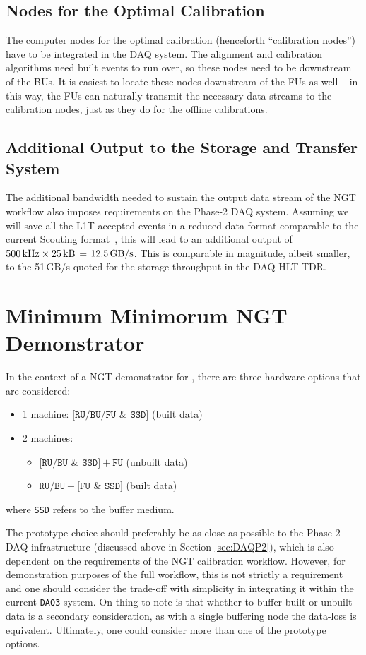 \subsection{Nodes for the Optimal Calibration}
The computer nodes for the optimal calibration (henceforth ``calibration nodes'') have to be integrated in the DAQ system.
The alignment and calibration algorithms need built events to run over, so these nodes need to be downstream of the BUs.
It is easiest to locate these nodes downstream of the FUs as well --
in this way, the FUs can naturally transmit the necessary data streams to the calibration nodes, 
just as they do for the offline calibrations.

\subsection{Additional Output to the Storage and Transfer System}
The additional bandwidth needed to sustain the output data stream of the NGT workflow also imposes requirements on the Phase-2 DAQ system.
Assuming we will save all the L1T-accepted events in a reduced data format comparable to the current Scouting format~\cite{CMS:2024zhe},
this will lead to an additional output of $500\,\text{kHz} 
\times 25\,\text{kB}$ = $12.5\,\text{GB/s}$.
This is comparable in magnitude, albeit smaller, to the 51\,GB/s quoted for the storage throughput in the DAQ-HLT TDR.

\section{Minimum Minimorum NGT Demonstrator}
In the context of a NGT demonstrator for \Runthree, there are three hardware options that are considered:
\begin{itemize}
    \item 1 machine: $[\texttt{RU/BU}/\texttt{FU}$ \& $\texttt{SSD}]$ (built data)
    \item 2 machines: 
    \begin{itemize}
        \item $[\texttt{RU/BU}$ \& $\texttt{SSD}] + \texttt{FU}$ (unbuilt data)
        \item $\texttt{RU/BU} + [\texttt{FU}$ \& $\texttt{SSD}]$ (built data)
    \end{itemize}
\end{itemize}
where \texttt{SSD} refers to the buffer medium.

The prototype choice should preferably be as close as possible to the Phase 2 DAQ infrastructure (discussed above in Section \ref{sec:DAQP2}), which is also dependent on the requirements of the NGT calibration workflow. However, for demonstration purposes of the full workflow, this is not strictly a requirement and one should consider the trade-off with simplicity in integrating it within the current \texttt{DAQ3} system. On thing to note is that whether to buffer built or unbuilt data is a secondary consideration, as with a single buffering node the data-loss is equivalent. Ultimately, one could consider more than one of the prototype options.


